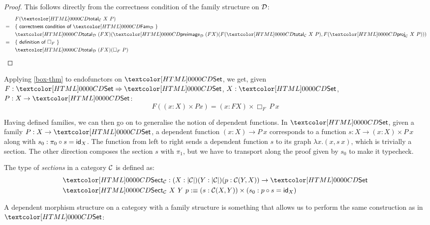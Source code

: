 \begin{proof}
  This follows directly from the correctness condition of the family
  structure on $\mathcal{D}$:
  \begin{align*}
    &&&F (\total_{\Cc}\ X\ P) \\
    &=& &\reasontext{correctness condition of $\Fam_{\Dd}$} \\
    &&&\total_{\Dd}\ (F X) (\preimage_{\Dd}\ (F X) (F (\total_{\Cc}\ X\ P), F (\proj_{\Cc}\ X\ P))) \\
    &=& &\reasontext{definition of $\Box_F$} \\
    &&&\total_{\Dd}\ (F X) (\Box_F\ P)
  \end{align*}
\end{proof}

\begin{corollary}
  Applying \cref{box-thm} to endofunctors on $\Set$, we get, given
  $F : \Func{\Set}{\Set}$, $X : \Set$, $P : X \to \Set$:
  $$
  F ((x : X) \times P x) = (x : FX) \times \Box_F\ P\ x
  $$
\end{corollary}

Having defined families, we can then go on to generalise the notion of
dependent functions. In $\Set$, given a family $P : X \to \Set$, a
dependent function $(x : X) \to P\ x$ corresponds to a function
$s : X \to (x : X) \times P\ x$ along with
$s_0 : \pi_0 \circ s = \id_X$. The function from left to right sends a
dependent function $s$ to its graph $\lambda x . (x , s\ x)$, which is
trivially a section. The other direction composes the section $s$ with
$\pi_1$, but we have to transport along the proof given by $s_0$ to
make it typecheck.

\begin{definition}
  The type of \emph{sections} in a category $\mathcal{C}$ is defined as:
  \begin{align*}
    &\Sect_{\Cc} : (X : | \Cc |) (Y : | \Cc |) (p : \Cc(Y,X)) \to \Set \\
    &\Sect_{\Cc}\ X\ Y\ p \ddefeq (s : \Cc(X,Y)) \times (s_0 : p \circ s = \id_X)
  \end{align*}
\end{definition}

A dependent morphism structure on a category with a family structure
is something that allows us to perform the same construction as in
$\Set$:

